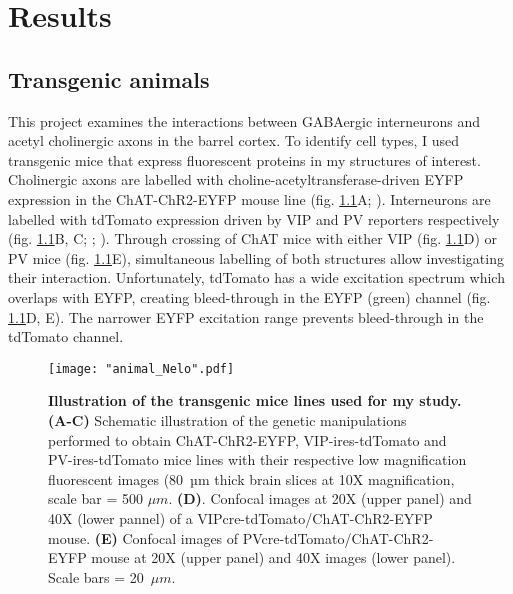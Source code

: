 \chapter{Results}
\label{ch:results}
\section{Transgenic animals}
\label{sec:transgenic animal}
This project examines the interactions between GABAergic interneurons and acetyl cholinergic axons in the barrel cortex. To identify cell types, I used transgenic mice that express fluorescent proteins in my structures of interest. Cholinergic axons are labelled with choline-acetyltransferase-driven EYFP expression in the ChAT-ChR2-EYFP mouse line (fig. \ref{fig:animal}A; \cite{Zhao2011}). Interneurons are labelled with tdTomato expression driven by VIP and PV reporters respectively (fig. \ref{fig:animal}B, C; \cite{Taniguchi2012}; \cite{Arber2015}). Through crossing of ChAT mice with either VIP (fig. \ref{fig:animal}D) or PV mice (fig. \ref{fig:animal}E), simultaneous labelling of both structures allow investigating their interaction. Unfortunately, tdTomato has a wide excitation spectrum which overlaps with EYFP, creating bleed-through in the EYFP (green) channel (fig. \ref{fig:animal}D, E). The narrower EYFP excitation range prevents bleed-through in the tdTomato channel.

\begin{figure}
	\captionsetup[figure]{indentation=0pt}
	\texttt{[image: "animal\_Nelo".pdf]}
	\caption{\textbf{Illustration of the transgenic mice lines used for my study.} \textbf{(A-C)} Schematic illustration of the genetic manipulations performed to obtain ChAT-ChR2-EYFP, VIP-ires-tdTomato and PV-ires-tdTomato mice lines with their respective low magnification fluorescent images (80~µm thick brain slices at 10X magnification, scale bar = 500 $\mu m$. \textbf{(D)}. Confocal images at 20X (upper panel) and 40X (lower pannel) of a VIPcre-tdTomato/ChAT-ChR2-EYFP mouse. \textbf{(E)} Confocal images of PVcre-tdTomato/ChAT-ChR2-EYFP mouse at 20X (upper panel) and 40X images (lower panel). Scale bars = 20~$\mu m$. }	
	\label{fig:animal}
\end{figure}

